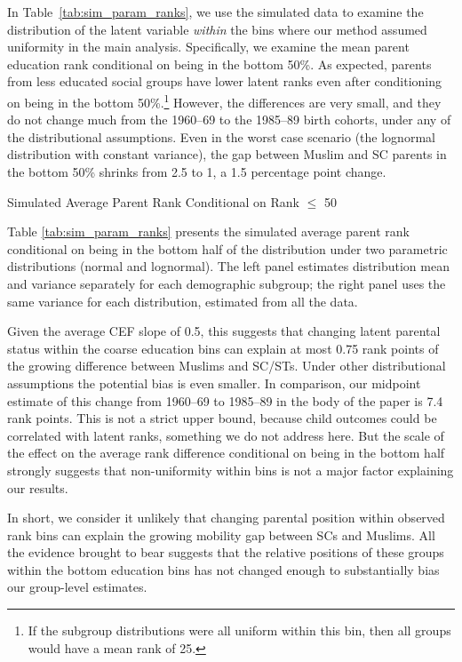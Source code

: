 In Table~\ref{tab:sim_param_ranks}, we use the simulated data to examine the
distribution of the latent variable \textit{within} the bins where our
method assumed uniformity in the main analysis. Specifically, we examine the mean parent
education rank conditional on being in the bottom 50\%. As expected,
parents from less educated social groups have lower latent ranks even
after conditioning on being in the bottom 50\%.\footnote{If the
  subgroup distributions were all uniform within this bin, then all
  groups would have a mean rank of 25.} However, the
differences are very small, and they do not change much from the
1960--69 to the 1985--89 birth cohorts, under any of the
distributional assumptions. Even in the worst case scenario (the
lognormal distribution with constant variance), the gap between Muslim
and SC parents in the bottom 50\% shrinks from 2.5 to 1, a 1.5
percentage point change.

\begin{table}
  \begin{center}
  \caption{Simulated Average Parent Rank Conditional on Rank $\leq$ 50}
  \label{tab:sim_param_ranks} 
  \small{}
  \end{center}
Table \ref{tab:sim_param_ranks} presents the simulated average parent rank conditional on being in the bottom half of the distribution under two parametric distributions (normal and lognormal). The left panel estimates distribution mean and variance separately for each demographic subgroup; the right panel uses the same variance for each distribution, estimated from all the data.
\end{table}  

Given the average CEF slope of 0.5, this suggests that changing latent
parental status within the coarse education bins can explain at most
0.75 rank points of the growing difference between Muslims and
SC/STs. Under other distributional assumptions the potential bias is
even smaller. In comparison, our midpoint estimate of this change from
1960--69 to 1985--89 in the body of the paper is 7.4 rank points. This is not a strict upper bound, because child outcomes could be correlated with latent ranks, something we do not address here. But the scale of the effect on the average rank difference conditional on being in the bottom half strongly suggests that non-uniformity within bins is not a major factor explaining our results.

In short, we consider it unlikely that changing parental position
within observed rank bins can explain the growing mobility gap between
SCs and Muslims. All the evidence brought to bear suggests that the relative positions of these groups within the bottom education
bins has not changed enough to substantially bias our
group-level estimates.

